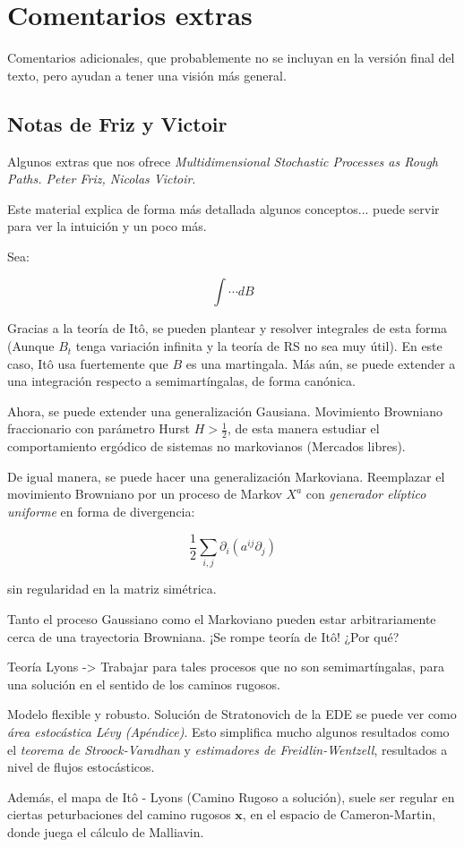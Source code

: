 
\section{Comentarios extras}

Comentarios adicionales, que probablemente no se incluyan en la versión final del texto, pero ayudan a tener una visión más general.

\subsection{Notas de Friz y Victoir}

Algunos extras que nos ofrece \textit{Multidimensional Stochastic Processes as Rough Paths. Peter Friz, Nicolas Victoir}.

Este material explica de forma más detallada algunos conceptos... puede servir para ver la intuición y un poco más.

Sea:

\[
	\int \cdots dB
\]

Gracias a la teoría de Itô, se pueden plantear y resolver integrales de esta forma (Aunque $B_t$ tenga variación infinita y la teoría de RS no sea muy útil). En este caso, Itô usa fuertemente que $B$ es una martingala. Más aún, se puede extender a una integración respecto a semimartíngalas, de forma canónica.


Ahora, se puede extender una generalización Gausiana. Movimiento Browniano fraccionario con parámetro Hurst $H > \frac{1}{2}$, de esta manera estudiar el comportamiento ergódico de sistemas no markovianos (Mercados libres).

De igual manera, se puede hacer una generalización Markoviana. Reemplazar el movimiento Browniano por un proceso de Markov $X^a$ con \textit{generador elíptico uniforme} en forma de divergencia:

\[
	\frac{1}{2} \sum_{i,j} \partial_i (a^{ij} \partial_j)
\]

sin regularidad en la matriz simétrica.

Tanto el proceso Gaussiano como el Markoviano pueden estar arbitrariamente cerca de una trayectoria Browniana. ¡Se rompe teoría de Itô! ¿Por qué?

Teoría Lyons -> Trabajar para tales procesos que no son semimartíngalas, para una solución en el sentido de los caminos rugosos.

Modelo flexible y robusto. Solución de Stratonovich de la EDE se puede ver como \textit{área estocástica Lévy (Apéndice)}. Esto simplifica mucho algunos resultados como el \textit{teorema de Stroock-Varadhan} y \textit{estimadores de Freidlin-Wentzell}, resultados a nivel de flujos estocásticos.

Además, el mapa de Itô - Lyons (Camino Rugoso a solución), suele ser regular en ciertas peturbaciones del camino rugosos $\mathbf{x}$, en el espacio de Cameron-Martin, donde juega el cálculo de Malliavin.